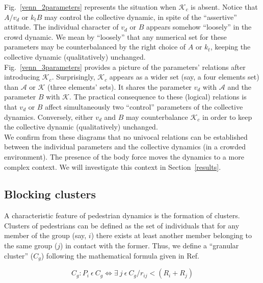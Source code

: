 \documentclass[preprint,12pt]{elsarticle}
\begin{document}
Fig.~\ref{venn_2parameters} represents the situation when $\mathcal{K}_c$ is 
absent. Notice that $A/v_d$ or $k_t B$ may control the collective 
dynamic, in spite of the ``assertive'' attitude. The individual character of 
$v_d$ or $B$ appears somehow ``loosely'' in the crowd dynamic. We mean by 
``loosely'' that any numerical set for these parameters may be 
counterbalanced by the right choice of $A$ or $k_t$, keeping the 
collective dynamic (qualitatively) unchanged.  \\

Fig.~\ref{venn_3parameters} provides a picture of the parameters' relations 
after introducing $\mathcal{K}_c$. Surprisingly, $\mathcal{K}_c$ appears as a
wider set (say, a four elements set) than $\mathcal{A}$ or $\mathcal{K}$ (three 
elements' sets). It shares the parameter $v_d$ with $\mathcal{A}$ and the 
parameter $B$ with $\mathcal{K}$. The practical consequence to these (logical)
relations is that $v_d$ or $B$ affect simultaneously two ``control'' parameters 
of the collective dynamics. Conversely, either $v_d$ and $B$ may counterbalance 
$\mathcal{K}_c$ in order to keep the collective dynamic (qualitatively) 
unchanged.  \\

We confirm from these diagrams that no univocal relations can be established 
between the individual parameters and the collective dynamics (in a crowded 
environment). The presence of the body force moves the dynamics to a more 
complex context. We will investigate this context in Section~\ref{results}. \\


\subsection{\label{blocking_clusters} Blocking clusters}

A characteristic feature of pedestrian dynamics is the formation of clusters. Clusters of pedestrians can 
be defined as the set of individuals that for any member of the group (say, $i$) there exists at least
another member belonging to the same group ($j$) in contact with the former. 
Thus, we define a ``granular cluster'' ($C_g$) following the mathematical formula given in Ref.~\cite{strachan1997fragment}

\begin{equation}
C_g:P_i~\epsilon~ C_g \Leftrightarrow \exists~ j~\epsilon~C_g / r_{ij} < (R_i+R_j) \label{ec-cluster}
\end{equation}
\end{document}
